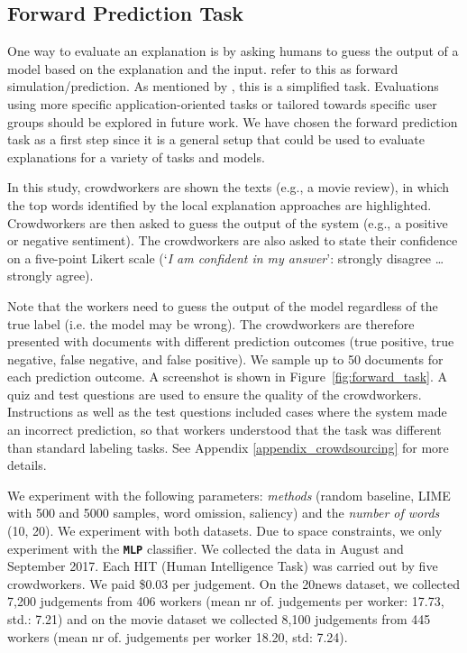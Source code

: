 \documentclass[11pt,a4paper]{article}
\begin{document}
\subsection{Forward Prediction Task}
One way to evaluate an explanation is by asking humans to guess the output of a model based on the explanation and the input. \citet{towards2017} refer to this as forward simulation/prediction.
As mentioned by \citet{towards2017}, this is a simplified task. Evaluations using more specific application-oriented tasks or tailored towards specific user groups should be explored in future work. We have chosen  the forward prediction task as a first step  since it is a general setup that could be  used to evaluate  explanations for a variety of tasks and models.



In this study,  crowdworkers are shown the texts (e.g., a movie review), in which the top words identified by the local explanation approaches are highlighted.
Crowdworkers are then asked to guess the output of the system (e.g., a positive or negative sentiment). The crowdworkers are also asked to state their confidence on a five-point Likert scale (`\emph{I am confident in my answer}': strongly disagree \dots strongly agree). 

Note that the workers need to guess the output of the model regardless of the true label (i.e. the model may be wrong). 
The crowdworkers are therefore presented with documents with different prediction outcomes (true positive, true negative, false negative, and false positive). We sample up to 50 documents for each prediction outcome. A screenshot is shown in Figure~\ref{fig:forward_task}.
 A quiz and test questions are used to ensure the quality of the crowdworkers. Instructions as well as the test questions included cases where the system made an incorrect prediction, so that workers understood that the task was different than standard labeling tasks. See Appendix \ref{appendix_crowdsourcing} for more details.
 
 We experiment with the following parameters: \emph{methods} (random baseline, LIME with 500 and 5000 samples, word omission, saliency) and the \emph{number of words} (10, 20). We experiment with both datasets. Due to space constraints, we only experiment with the \textbf{\texttt{MLP}} classifier. 
 We collected the data in August and September 2017. Each HIT (Human Intelligence Task) was carried out by five crowdworkers. We paid \$0.03 per  judgement. 
On the 20news dataset, we collected 7,200 judgements from 406 workers (mean nr of. judgements per worker: 17.73, std.: 7.21) and on the movie dataset we collected 8,100 judgements from 445 workers (mean nr of. judgements per worker 18.20, std: 7.24).
\end{document}
